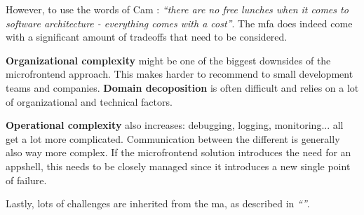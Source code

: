 However, to use the words of Cam \textcite{Jackson_2019}: \textit{``there are no
free lunches when it comes to software architecture - everything comes with a
cost''}. The \gls{mfa} does indeed come with a significant amount of tradeoffs
that need to be considered. 

\textbf{Organizational complexity} might be one of the biggest downsides of the
\gls{microfrontend} approach. This makes  harder to
recommend to small development teams and companies. \textbf{Domain decoposition}
is often difficult and relies on a lot of organizational and technical factors. 

\textbf{Operational complexity} also increases: debugging, logging,
monitoring... all get a lot more complicated. Communication between the
different  is generally also way more complex. If the
\gls{microfrontend} solution introduces the need for an \gls{appshell}, this
needs to be closely managed since it introduces a new single point of failure.

Lastly, lots of challenges are inherited from the \gls{ma}, as described in
\textit{``''}.

